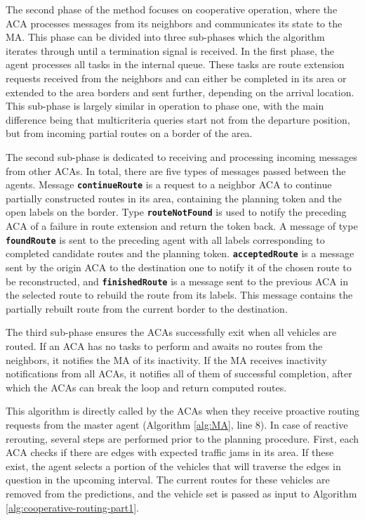 \documentclass[sigconf]{aamas}
\begin{document}
The second phase of the method focuses on cooperative operation, where the ACA processes messages from its neighbors and communicates its state to the MA. This phase can be divided into three sub-phases which the algorithm iterates through until a termination signal is received. In the first phase, the agent processes all tasks in the internal queue. These tasks are route extension requests received from the neighbors and can either be completed in its area or extended to the area borders and sent further, depending on the arrival location. This sub-phase is largely similar in operation to phase one, with the main difference being that multicriteria queries start not from the departure position, but from incoming partial routes on a border of the area.

The second sub-phase is dedicated to receiving and processing incoming messages from other ACAs. In total, there are five types of messages passed between the agents. Message \textbf{\texttt{continueRoute}} is a request to a neighbor ACA to continue partially constructed routes in its area, containing the planning token and the open labels on the border. Type \textbf{\texttt{routeNotFound}} is used to notify the preceding ACA of a failure in route extension and return the token back. A message of type \textbf{\texttt{foundRoute}} is sent to the preceding agent with all labels corresponding to completed candidate routes and the planning token. \textbf{\texttt{acceptedRoute}} is a message sent by the origin ACA to the destination one to notify it of the chosen route to be reconstructed, and \textbf{\texttt{finishedRoute}} is a message sent to the previous ACA in the selected route to rebuild the route from its labels. This message contains the partially rebuilt route from the current border to the destination.

The third sub-phase ensures the ACAs successfully exit when all vehicles are routed. If an ACA has no tasks to perform and awaits no routes from the neighbors, it notifies the MA of its inactivity. If the MA receives inactivity notifications from all ACAs, it notifies all of them of successful completion, after which the ACAs can break the loop and return computed routes.

This algorithm is directly called by the ACAs when they receive proactive routing requests from the master agent (Algorithm \ref{alg:MA}, line 8). In case of reactive rerouting, several steps are performed prior to the planning procedure. First, each ACA checks if there are edges with expected traffic jams in its area. If these exist, the agent selects a portion of the vehicles that will traverse the edges in question in the upcoming interval. The current routes for these vehicles are removed from the predictions, and the vehicle set is passed as input to Algorithm \ref{alg:cooperative-routing-part1}.
\end{document}
